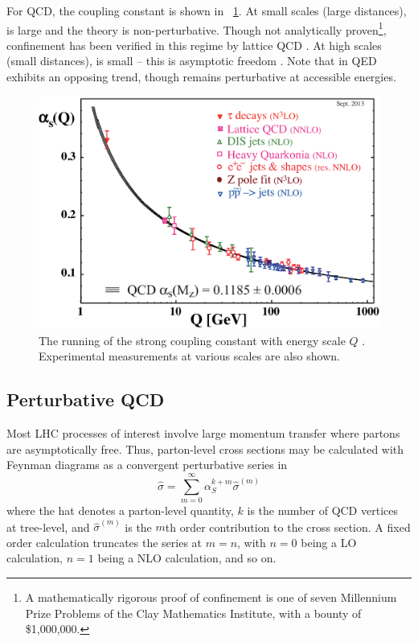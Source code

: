 For \ac{QCD}, the coupling constant \alphaS is shown in \Figure~\ref{fig:alpha_s}. At 
small scales (large distances), \alphaS is large and the theory is non-perturbative. 
Though not analytically proven\footnote{
	A mathematically rigorous proof of confinement is one of seven Millennium Prize 
	Problems of the Clay Mathematics Institute, with a bounty of \$1,000,000.
}, confinement has been verified in this regime by lattice \ac{QCD} \cite{Wilson:1974}. 
At high scales (small distances), \alphaS is small -- this is asymptotic freedom 
\cite{Gross:1973,Politzer:1973}. Note that \alphaEM in \acs{QED} exhibits an opposing 
trend, though remains perturbative at accessible energies.
\begin{figure}
	\includegraphics[width=\mediumfigwidth]{tex/tools/alpha_s}
	\caption{The running of the strong coupling constant \alphaS with energy scale $Q$ 
	\cite{PDG:2012}. Experimental measurements at various scales are also shown.}
	\label{fig:alpha_s}
\end{figure}



\subsection{Perturbative QCD}
\label{sec:qcd:pqcd}

Most \acs{LHC} processes of interest involve large momentum transfer where partons are 
asymptotically free. Thus, parton-level cross sections may be calculated with Feynman 
diagrams as a convergent perturbative series in \alphaS
\begin{equation}
	\hat{\sigma} = \sum\limits_{m=0}^{\infty} \alpha_S^{k+m} \hat{\sigma}^{(m)}
	\label{eq:qcd:partonic_xs}
\end{equation}
where the hat denotes a parton-level quantity, $k$ is the number of \ac{QCD} vertices at 
tree-level, and $\hat{\sigma}^{(m)}$ is the $m$th order contribution to the cross section.
A fixed order calculation truncates the series at $m=n$, with $n=0$ being a \ac{LO} 
calculation, $n=1$ being a \ac{NLO} calculation, and so on.


